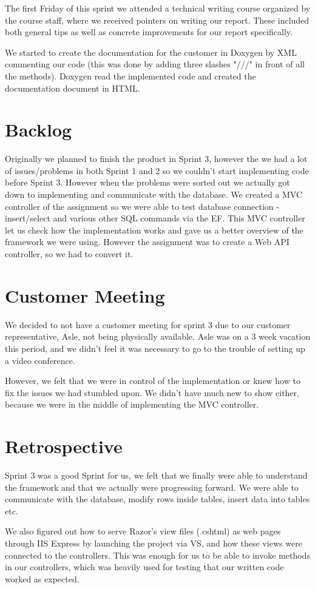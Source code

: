 The first Friday of this sprint we attended a technical writing course organized by the course staff, where we received pointers on writing our report. These included both general tips as well as concrete improvements for our report specifically.

We started to create the documentation for the customer in Doxygen by XML commenting our code (this was done by adding three slashes "///" in front of all the methods). Doxygen read the implemented code and created the documentation document in HTML. 

\section{Backlog}
Originally we planned to finish the product in Sprint 3, however the we had a lot of issues/problems in both Sprint 1 and 2 so we couldn't start implementing code before Sprint 3. However when the problems were sorted out we actually got down to implementing and communicate with the database. We created a MVC controller of the assignment so we were able to test database connection - insert/select and various other SQL commands via the EF. This MVC controller let us check how the implementation works and gave us a better overview of the framework we were using. However the assignment was to create a Web API controller, so we had to convert it.


\section{Customer Meeting}
We decided to not have a customer meeting for sprint 3 due to our customer representative, Asle, not being physically available. Asle was on a 3 week vacation this period, and we didn't feel it was necessary to go to the trouble of setting up a video conference.

However, we felt that we were in control of the implementation or knew how to fix the issues we had stumbled upon. We didn't have much new to show either, because we were in the middle of implementing the MVC controller.

\section{Retrospective}
Sprint 3 was a good Sprint for us, we felt that we finally were able to understand the framework and that we actually were progressing forward. We were able to communicate with the database, modify rows inside tables, insert data into tables etc.

We also figured out how to serve Razor's view files (.cshtml) as web pages through IIS Express by launching the project via VS, and how these views were connected to the controllers. This was enough for us to be able to invoke methods in our controllers, which was heavily used for testing that our written code worked as expected.